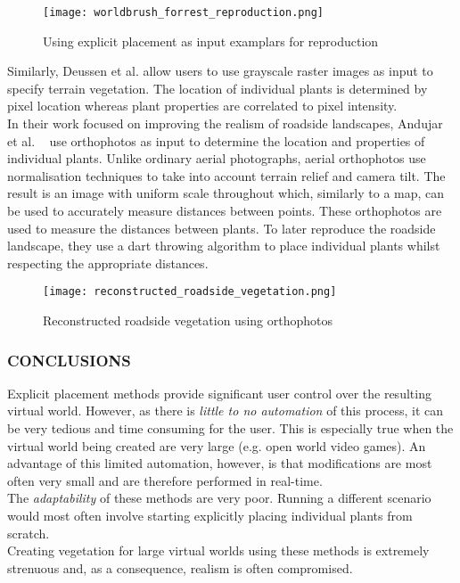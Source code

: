 \begin{figure}[h]
  \centering
	\texttt{[image: worldbrush\_forrest\_reproduction.png]}
	\caption{Using explicit placement as input examplars for reproduction \cite{Emilien}}
	\label{Explicit placement as input examplars}
\end{figure}

Similarly, Deussen et al. \cite{Deussen1998} allow users to use grayscale raster images as input to specify terrain vegetation. The location of individual plants is determined by pixel location whereas plant properties are correlated to pixel intensity.\\

In their work focused on improving the realism of roadside landscapes, Andujar et al. ~\cite{Andujar2014} use orthophotos as input to determine the location and properties of individual plants. Unlike ordinary aerial photographs, aerial orthophotos use normalisation techniques to take into account terrain relief and camera tilt. The result is an image with uniform scale throughout which, similarly to a map, can be used to accurately measure distances between points. These orthophotos are used to measure the distances between plants. To later reproduce the roadside landscape, they use a dart throwing algorithm to place individual plants whilst respecting the appropriate distances. \\

\begin{figure}[!htb]
  \centering
	\label{Reconstructed roadside vegetation using orthophotos}
	\texttt{[image: reconstructed\_roadside\_vegetation.png]}
	\caption{Reconstructed roadside vegetation using orthophotos ~\cite{Andujar2014}}
\end{figure}

\subsubsection{CONCLUSIONS}

Explicit placement methods provide significant user control over the resulting virtual world. However, as there is \textit{little to no automation} of this process, it can be very tedious and time consuming for the user. This is especially true when the virtual world being created are very large (e.g. open world video games). An advantage of this limited automation, however, is that modifications are most often very small and are therefore performed in real-time. \\
The \textit{adaptability} of these methods are very poor. Running a different scenario would most often involve starting explicitly placing individual plants from scratch.\\
Creating vegetation for large virtual worlds using these methods is extremely strenuous and, as a consequence, realism is often compromised.

